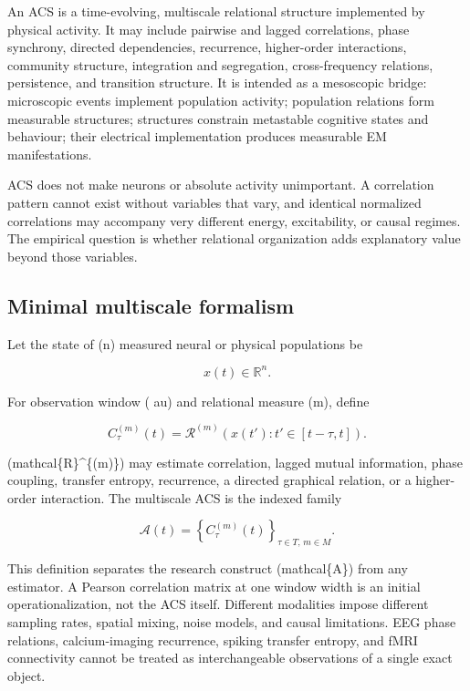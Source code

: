 \documentclass[
  11pt,
  a4paper,
]{article}
\begin{document}
An ACS is a time-evolving, multiscale relational structure implemented
by physical activity. It may include pairwise and lagged correlations,
phase synchrony, directed dependencies, recurrence, higher-order
interactions, community structure, integration and segregation,
cross-frequency relations, persistence, and transition structure. It is
intended as a mesoscopic bridge: microscopic events implement population
activity; population relations form measurable structures; structures
constrain metastable cognitive states and behaviour; their electrical
implementation produces measurable EM manifestations.

ACS does not make neurons or absolute activity unimportant. A
correlation pattern cannot exist without variables that vary, and
identical normalized correlations may accompany very different energy,
excitability, or causal regimes. The empirical question is whether
relational organization adds explanatory value beyond those variables.

\subsection{Minimal multiscale
formalism}\label{minimal-multiscale-formalism}

Let the state of (n) measured neural or physical populations be

\[
x(t) \in \mathbb{R}^{n}.
\]

For observation window ( au) and relational measure (m), define

\[
C_{\tau}^{(m)}(t)
=
\mathcal{R}^{(m)}
\left(
x(t') : t' \in [t-\tau,t]
\right).
\]

(mathcal\{R\}\^{}\{(m)\}) may estimate correlation, lagged mutual
information, phase coupling, transfer entropy, recurrence, a directed
graphical relation, or a higher-order interaction. The multiscale ACS is
the indexed family

\[
\mathcal{A}(t)
=
\left\{
C_{\tau}^{(m)}(t)
\right\}_{\tau \in T,\,m \in M}.
\]

This definition separates the research construct (mathcal\{A\}) from any
estimator. A Pearson correlation matrix at one window width is an
initial operationalization, not the ACS itself. Different modalities
impose different sampling rates, spatial mixing, noise models, and
causal limitations. EEG phase relations, calcium-imaging recurrence,
spiking transfer entropy, and fMRI connectivity cannot be treated as
interchangeable observations of a single exact object.
\end{document}
